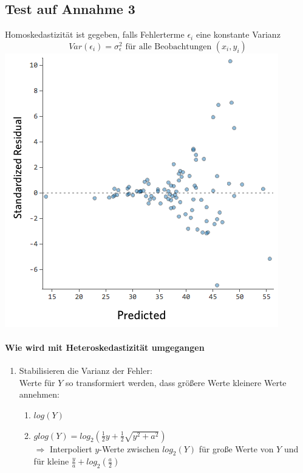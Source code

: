 \subsection{Test auf Annahme 3}
Homoskedastizität ist gegeben, falls Fehlerterme $\epsilon_i$ eine konstante Varianz
\[ Var(\epsilon_i) = \sigma_{\epsilon}^{2} \text{ für alle  Beobachtungen } (x_i, y_i) \] 
\includegraphics[scale=0.5]{VorlesungenTexDateien/images/Heteroscadicity}

\paragraph{Wie wird mit Heteroskedastizität umgegangen}
\begin{enumerate}
	\item Stabilisieren die Varianz der Fehler:\\
		Werte für $Y$ so transformiert werden, dass größere Werte kleinere Werte annehmen:
		\begin{enumerate}
			\item $log(Y)$
			\item $glog(Y) = log_{2}(\frac{1}{2} y + \frac{1}{2}\sqrt{y^{2} + a^{2}} ) $ \\
				$\Rightarrow$ Interpoliert $y$-Werte zwischen $log_2(Y)$ für große Werte von $Y$ und für kleine $\frac{y}{a} + log_2(\frac{a}{2})$
		\end{enumerate}
\end{enumerate}
